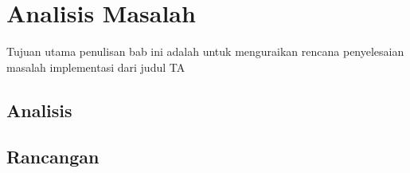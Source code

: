\chapter{Analisis Masalah}

Tujuan utama penulisan bab ini adalah untuk menguraikan rencana penyelesaian masalah implementasi dari judul TA

\section{Analisis}
\blindtext

\section{Rancangan}
\blindtext